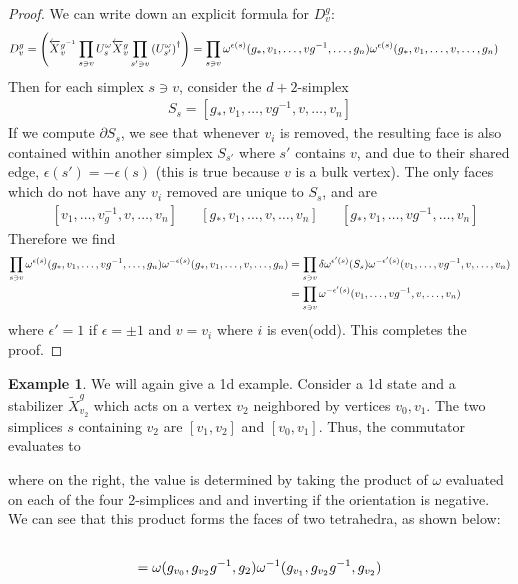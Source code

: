 \documentclass{article}
\theoremstyle{definition}
\theoremstyle{definition}
\newtheorem{ex}{Example}
\begin{document}
\begin{proof}
We can write down an explicit formula for $D_{v}^g$:
\begin{align}
  D_v^g = \qty(\overleftarrow X^{g^{-1}}_v\prod_{s \ni v}U_s^\omega \overleftarrow X^g_v  \prod_{s' \ni v}\qty(U_{s'}^\omega)^\dagger) &= \prod_{s \ni v} \omega^{\epsilon(s)}(g_*, v_1, \ldots, vg^{-1}, \ldots, g_n) \omega^{\epsilon(s)}(g_*, v_1, \ldots, v, \ldots, g_n)
\end{align}
Then for each simplex $s \ni v$, consider the $d+2$-simplex
\begin{align}
  S_s = [g_*, v_1, \ldots, vg^{-1}, v, \ldots, v_n]
\end{align}
If we compute $\partial S_s$, we see that whenever $v_i$ is removed, the
resulting face is also contained within another simplex $S_{s'}$ where $s'$
contains $v$, and due to their shared edge, $\epsilon(s') = -\epsilon(s)$ (this
is true because $v$ is a bulk vertex).
The only faces which do not have any $v_i$ removed are unique to $S_s$, and are
\begin{align}
  &[v_1, \ldots, v_g^{-1}, v, \ldots, v_n] & &[g_*, v_1, \ldots, v, \ldots, v_n] & &[g_*, v_1, \ldots, vg^{-1}, \ldots, v_n]
\end{align}
Therefore we find
\begin{align}
\prod_{s \ni v} \omega^{\epsilon(s)}(g_*, v_1, \ldots, vg^{-1}, \ldots, g_n) \omega^{-\epsilon(s)}(g_*, v_1, \ldots, v, \ldots, g_n) &= 
\prod_{s \ni v} \delta\omega^{\epsilon'(s)}(S_s) \omega^{-\epsilon'(s)}(v_1, \ldots, vg^{-1}, v, \ldots, v_n) \notag\\
&= \prod_{s \ni v} \omega^{-\epsilon'(s)}(v_1, \ldots, vg^{-1}, v, \ldots, v_n)
\end{align}
where $\epsilon' = 1$ if $\epsilon = \pm 1$ and $v = v_i$ where $i$ is
even(odd).
This completes the proof.
\end{proof}

\begin{ex}\label{ex:TQD-stabilizer-phase-1d-example}
We will again give a 1d example.
Consider a 1d state and a stabilizer $\widetilde X^g_{v_2}$ which acts on a vertex $v_2$ neighbored by vertices $v_0, v_1$. The two simplices $s$ containing $v_2$ are $[v_1, v_2]$ and $[v_0, v_1]$. Thus, the commutator evaluates to
\begin{center}
\hspace{-2cm}
\end{center}
where on the right, the value is determined by taking the product of $\omega$ evaluated on each of the four 2-simplices and and inverting if the orientation is negative. We can see that this product forms the faces of two tetrahedra, as shown below:
\begin{align}\label{eq:phasefactor}
 \notag\\
= \omega(g_{v_0}, g_{v_2}g^{-1}, g_2)\omega^{-1}(g_{v_1}, g_{v_2}g^{-1}, g_{v_2})
\end{align}
\end{ex}
\end{document}

